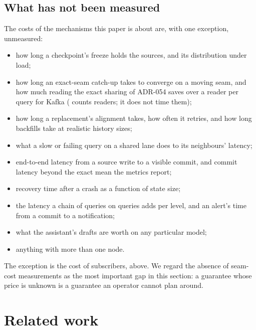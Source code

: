 \documentclass[11pt,a4paper]{article}
\renewcommand{\_}{\oldunderscore\allowbreak}
\newcommand{\cls}[1]{\texttt{\pvbreakable{#1}}}
\begin{document}
\subsection{What has not been measured}\label{sec:unmeasured}

The costs of the mechanisms this paper is about are, with one exception, unmeasured:
\begin{itemize}[leftmargin=*,itemsep=2pt]
\item how long a checkpoint's freeze holds the sources, and its distribution under load;
\item how long an exact-seam catch-up takes to converge on a moving seam, and how much reading the
      exact sharing of ADR-054 saves over a reader per query for Kafka (\cls{ExactSharingTest} counts
      readers; it does not time them);
\item how long a replacement's alignment takes, how often it retries, and how long backfills take at
      realistic history sizes;
\item what a slow or failing query on a shared lane does to its neighbours' latency;
\item end-to-end latency from a source write to a visible commit, and commit latency beyond the exact
      mean the metrics report;
\item recovery time after a crash as a function of state size;
\item the latency a chain of queries on queries adds per level, and an alert's time from a commit to a
      notification;
\item what the assistant's drafts are worth on any particular model;
\item anything with more than one node.
\end{itemize}
The exception is the cost of subscribers, above. We regard the absence of seam-cost measurements as the
most important gap in this section: a guarantee whose price is unknown is a guarantee an operator cannot
plan around.

\section{Related work}\label{sec:related}
\end{document}
